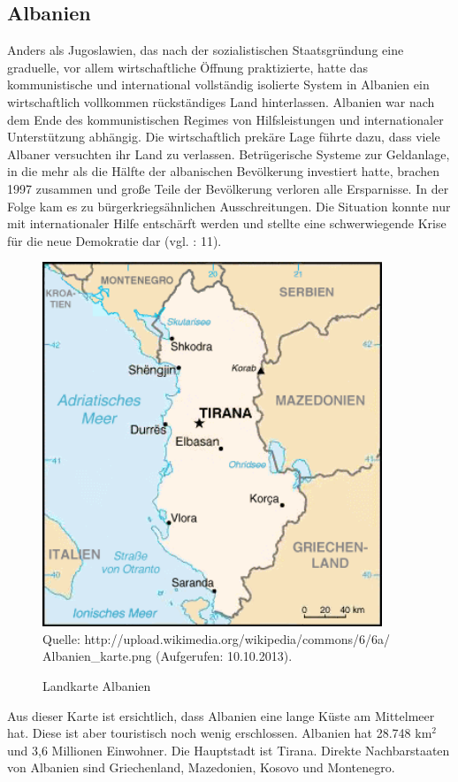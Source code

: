 \subsection{Albanien}
Anders als Jugoslawien, das nach der sozialistischen Staatsgründung eine graduelle, vor allem wirtschaftliche Öffnung praktizierte, hatte das kommunistische und international vollständig isolierte System in Albanien ein wirtschaftlich vollkommen rückständiges Land hinterlassen. Albanien war nach dem Ende des kommunistischen Regimes von Hilfsleistungen und internationaler Unterstützung abhängig. Die wirtschaftlich prekäre Lage führte dazu, dass viele Albaner versuchten ihr Land zu verlassen. Betrügerische Systeme zur Geldanlage, in die mehr als die Hälfte der albanischen Bevölkerung investiert hatte, brachen 1997 zusammen und große Teile der Bevölkerung verloren alle Ersparnisse. In der Folge kam es zu bürgerkriegsähnlichen Ausschreitungen. Die Situation konnte nur mit internationaler Hilfe entschärft werden und stellte eine schwerwiegende Krise für die neue Demokratie dar (vgl. \cite{jarvis} : 11).
\begin{figure}[H]

  \caption{Landkarte Albanien}
  \centering
  \includegraphics[width=4in]{Material/Albanien_karte}\\
  Quelle: http://upload.wikimedia.org/wikipedia/commons/6/6a/\\
Albanien\_karte.png (Aufgerufen: 10.10.2013).
\end{figure}
Aus dieser Karte ist ersichtlich, dass Albanien eine lange Küste am Mittelmeer hat. Diese ist aber touristisch noch wenig erschlossen. Albanien hat 28.748 km$^2$ und 3,6 Millionen Einwohner. Die Hauptstadt ist Tirana. Direkte Nachbarstaaten von Albanien sind Griechenland, Mazedonien, Kosovo und Montenegro.


